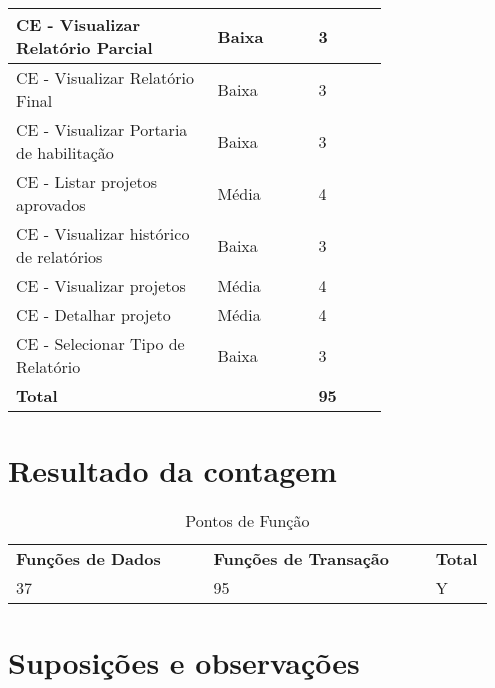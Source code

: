 \begin{table*}[!h]
\begin{tabular}{|p{0.40\linewidth}|p{0.20\linewidth}|p{0.14\linewidth}|}
	  CE - Visualizar Relatório Parcial & Baixa& 3\\ \hline
	  CE - Visualizar Relatório Final & Baixa&3 \\ \hline
	  CE - Visualizar Portaria de habilitação &Baixa & 3\\ \hline
	  CE - Listar projetos aprovados & Média& 4\\ \hline
	  CE - Visualizar histórico de relatórios & Baixa& 3\\ \hline
	  CE - Visualizar projetos & Média& 4\\ \hline
	  CE - Detalhar projeto & Média& 4\\ \hline
	  CE - Selecionar Tipo de Relatório &Baixa & 3\\ \hline
	  \multicolumn{2}{|l|}{\textbf{Total}} & \textbf{95} \\
	\hline
	\end{tabular}
	\end{table*}

\vfill
\pagebreak
\section{Resultado da contagem}

\begin{table*}[!h]
\centering
\caption{Pontos de Função}
\label{resultado_contagem}
  \begin{tabular}{|p{0.40\linewidth}|p{0.45\linewidth}|p{0.10\linewidth}|}
  \hline
  \textbf{Funções de Dados} & \textbf{Funções de Transação} & \textbf{Total} \\ 
  37 & 95 & Y\\
  \hline
 
  \end{tabular}
\end{table*}

\section{Suposições e observações}

